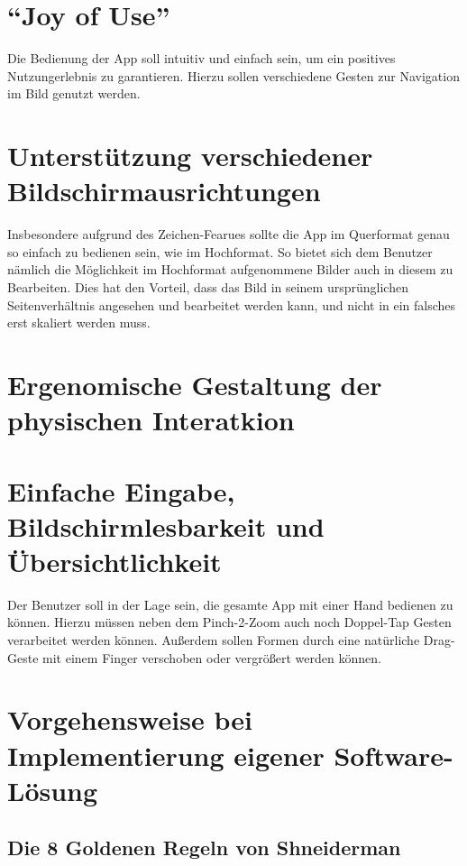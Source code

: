 \section{``Joy of Use''}
Die Bedienung der App soll intuitiv und einfach sein, um ein positives Nutzungerlebnis zu garantieren.
Hierzu sollen verschiedene Gesten zur Navigation im Bild genutzt werden.

\section{Unterstützung verschiedener Bildschirmausrichtungen}
Insbesondere aufgrund des Zeichen-Fearues sollte die App im Querformat genau so einfach zu bedienen sein, wie im Hochformat.
So bietet sich dem Benutzer nämlich die Möglichkeit im Hochformat aufgenommene Bilder auch in diesem zu Bearbeiten.
Dies hat den Vorteil, dass das Bild in seinem ursprünglichen Seitenverhältnis angesehen und bearbeitet werden kann, und nicht in ein falsches erst skaliert werden muss.

\section{Ergenomische Gestaltung der physischen Interatkion}

\section{Einfache Eingabe, Bildschirmlesbarkeit und Übersichtlichkeit}
Der Benutzer soll in der Lage sein, die gesamte App mit einer Hand bedienen zu können.
Hierzu müssen neben dem Pinch-2-Zoom auch noch Doppel-Tap Gesten verarbeitet werden können.
Außerdem sollen Formen durch eine natürliche Drag-Geste mit einem Finger verschoben oder vergrößert werden können.

\section{Vorgehensweise bei Implementierung eigener Software-Lösung}
\subsection{Die 8 Goldenen Regeln von Shneiderman}

